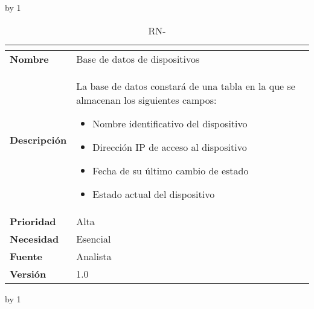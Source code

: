 \advance\rn by 1
\begin{table}[H]
	\caption{RN-\number\rn}
	\begin{tabular}{|l|p{}|}
		\hline
		\multicolumn{2}{|c|}{\cellcolor[HTML]{BFBFBF}{\color[HTML]{000000} \textbf{RN-\number\rn}}} \\ \hline
		\textbf{Nombre}      & Base de datos de dispositivos                                                        \\ \hline
		\textbf{Descripción} & La base de datos constará de una tabla en la que se almacenan los siguientes campos:
		\begin{itemize}
			\item Nombre identificativo del dispositivo
			\item Dirección IP de acceso al dispositivo
			\item Fecha de su último cambio de estado
			\item Estado actual del dispositivo
		\end{itemize}  \\ \hline
		\textbf{Prioridad}   & Alta                                                                                 \\ \hline
		\textbf{Necesidad}   & Esencial                                                                             \\ \hline
		\textbf{Fuente}      & Analista                                                                             \\ \hline
		\textbf{Versión}     & 1.0                                                                                  \\ \hline
	\end{tabular}
\end{table}
\advance\rn by 1
